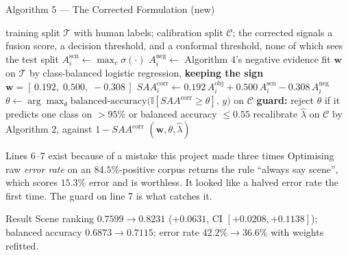 \documentclass[aspectratio=169,11pt]{beamer}
\begin{document}
\begin{frame}{Algorithm 5 --- The Corrected Formulation (new)}
\tiny
\begin{algorithmic}[1]
\Require training split $\mathcal{T}$ with human labels; calibration split $\mathcal{C}$; the corrected signals
\Ensure a fusion score, a decision threshold, and a conformal threshold, none of which sees the test split
\State $A^{\text{scn}}_i \leftarrow \max_c \sigma(\cdot)$ \Comment{\textcolor{ForestGreen}{sigmoid channel, not softmax --- fixes a below-chance signal}}
\State $A^{\text{neg}}_i \leftarrow$ Algorithm 4's negative evidence
\State fit $\mathbf{w}$ on $\mathcal{T}$ by class-balanced logistic regression, \textbf{keeping the sign}
\State \quad $\mathbf{w} = [\,0.192,\; 0.500,\; -0.308\,]$ \Comment{\textcolor{ForestGreen}{the only negative weight in the system}}
\State $SAA^{\text{corr}}_i \leftarrow 0.192\,A^{\text{obj}}_i + 0.500\,A^{\text{scn}}_i - 0.308\,A^{\text{neg}}_i$
\State $\theta \leftarrow \arg\max_\theta \text{balanced-accuracy}\big(\mathbb{I}[SAA^{\text{corr}} \ge \theta],\, y\big)$ on $\mathcal{C}$ 
\State \textbf{guard:} reject $\theta$ if it predicts one class on $>95\%$ or balanced accuracy $\le 0.55$
\State recalibrate $\hat\lambda$ on $\mathcal{C}$ by Algorithm 2, against $1 - SAA^{\text{corr}}$ 
\State \Return $(\mathbf{w}, \theta, \hat\lambda)$
\end{algorithmic}
\vspace{1mm}
\begin{alertblock}{\scriptsize Lines 6--7 exist because of a mistake this project made three times}
\scriptsize Optimising raw \emph{error rate} on an $84.5\%$-positive corpus returns the rule ``always say scene'', which scores $15.3\%$ error and is worthless. It looked like a halved error rate the first time. The guard on line 7 is what catches it.
\end{alertblock}
\vspace{-1mm}
\begin{exampleblock}{\scriptsize Result}
\scriptsize Scene ranking $0.7599 \to \mathbf{0.8231}$ ($+0.0631$, CI $[+0.0208,+0.1138]$); balanced accuracy $0.6873 \to 0.7115$; error rate $42.2\% \to 36.6\%$ with weights refitted.
\end{exampleblock}
\end{frame}
\end{document}
